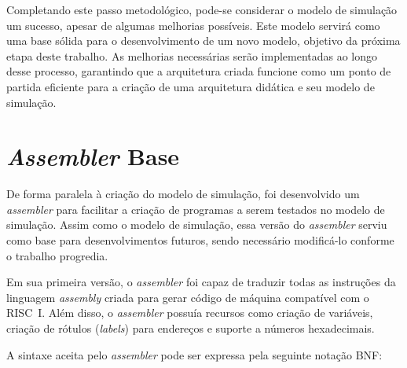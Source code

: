 \documentclass[
	12pt,				%
	openright,			%
	oneside,			%
	a4paper,			%
	english,			%
	french,				%
	spanish,			%
	brazil,				%
	]{abntex2}
\begin{document}
Completando este passo metodológico, pode-se considerar o modelo de simulação um sucesso, apesar de algumas melhorias possíveis. Este modelo servirá como uma base sólida para o desenvolvimento de um novo modelo, objetivo da próxima etapa deste trabalho. As melhorias necessárias serão implementadas ao longo desse processo, garantindo que a arquitetura criada funcione como um ponto de partida eficiente para a criação de uma arquitetura didática e seu modelo de simulação.

\section{\textit{Assembler} Base}

De forma paralela à criação do modelo de simulação, foi desenvolvido um \textit{assembler} para facilitar a criação de programas a serem testados no modelo de simulação. Assim como o modelo de simulação, essa versão do \textit{assembler} serviu como base para desenvolvimentos futuros, sendo necessário modificá-lo conforme o trabalho progredia.

Em sua primeira versão, o \textit{assembler} foi capaz de traduzir todas as instruções da linguagem \textit{assembly} criada para gerar código de máquina compatível com o RISC~I. Além disso, o \textit{assembler} possuía recursos como criação de variáveis, criação de rótulos (\textit{labels}) para endereços e suporte a números hexadecimais.

A sintaxe aceita pelo \textit{assembler} pode ser expressa pela seguinte notação BNF:
\end{document}

